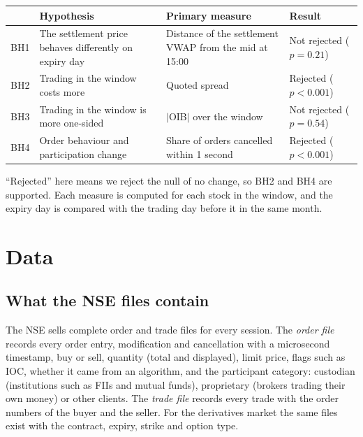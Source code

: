 \documentclass[11pt,a4paper]{article}
\begin{document}
\begin{center}
\small
\begin{tabularx}{\textwidth}{lXXl}
\toprule
 & Hypothesis & Primary measure & Result \\
\midrule
BH1 & The settlement price behaves differently on expiry day &
  Distance of the settlement VWAP from the mid at 15:00 & Not rejected ($p=0.21$) \\
BH2 & Trading in the window costs more & Quoted spread & Rejected ($p<0.001$) \\
BH3 & Trading in the window is more one-sided & $|$OIB$|$ over the window & Not rejected ($p=0.54$) \\
BH4 & Order behaviour and participation change & Share of orders cancelled within 1 second &
  Rejected ($p<0.001$) \\
\bottomrule
\end{tabularx}
\end{center}

``Rejected'' here means we reject the null of no change, so BH2 and BH4 are supported. Each
measure is computed for each stock in the window, and the expiry day is compared with the
trading day before it in the same month.

\section{Data}

\subsection{What the NSE files contain}

The NSE sells complete order and trade files for every session. The \emph{order file} records
every order entry, modification and cancellation with a microsecond timestamp, buy or sell,
quantity (total and displayed), limit price, flags such as IOC, whether it came from an algorithm,
and the participant category: custodian (institutions such as FIIs and mutual funds),
proprietary (brokers trading their own money) or other clients. The \emph{trade file} records every
trade with the order numbers of the buyer and the seller. For the derivatives market the same
files exist with the contract, expiry, strike and option type.
\end{document}
